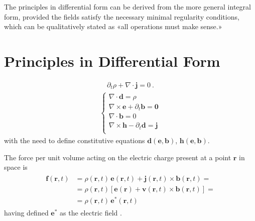 \documentclass[letterpaper,10pt,italian]{jupyterBook}
\begin{document}
\sphinxAtStartPar
The principles in differential form can be derived from the more general integral form, provided the fields satisfy the necessary minimal regularity conditions, which can be qualitatively stated as «all operations must make sense.»


\section{Principles in Differential Form}
\label{\detokenize{ch/principles:principles-in-differential-form}}\label{\detokenize{ch/principles:classical-electromagnetism-principles-differential}}
\sphinxAtStartPar
{}
\begin{equation*}
\begin{split}\partial_t \rho + \nabla \cdot \mathbf{j} = 0 \ .\end{split}
\end{equation*}
\sphinxAtStartPar
{}
\begin{equation*}
\begin{split}\begin{cases}
 \nabla \cdot \mathbf{d} = \rho \\
 \nabla \times \mathbf{e} + \partial_t \mathbf{b} = \mathbf{0} \\ 
 \nabla \cdot \mathbf{b} = 0 \\
 \nabla \times \mathbf{h} - \partial_t \mathbf{d} = \mathbf{j} \\
\end{cases}\end{split}
\end{equation*}
\sphinxAtStartPar
with the need to define constitutive equations \(\mathbf{d}(\mathbf{e}, \mathbf{b})\), \(\mathbf{h}(\mathbf{e}, \mathbf{b})\).

\sphinxAtStartPar
{} The force per unit volume acting on the electric charge present at a point \(\mathbf{r}\) in space is
\begin{equation*}
\begin{split}\begin{aligned}
  \mathbf{f}(\mathbf{r},t) & = \rho(\mathbf{r},t) \, \mathbf{e}(\mathbf{r},t) + \mathbf{j}(\mathbf{r},t) \times \mathbf{b}(\mathbf{r},t) = \\
                           & = \rho(\mathbf{r},t) \left[ \mathbf{e}(\mathbf{r}) + \mathbf{v}(\mathbf{r},t) \times \mathbf{b}(\mathbf{r},t) \right] =  \\
                           & = \rho(\mathbf{r},t) \, \mathbf{e}^*(\mathbf{r},t) 
\end{aligned}\end{split}
\end{equation*}
\sphinxAtStartPar
having defined \(\mathbf{e}^*\) as the electric field .
\end{document}
